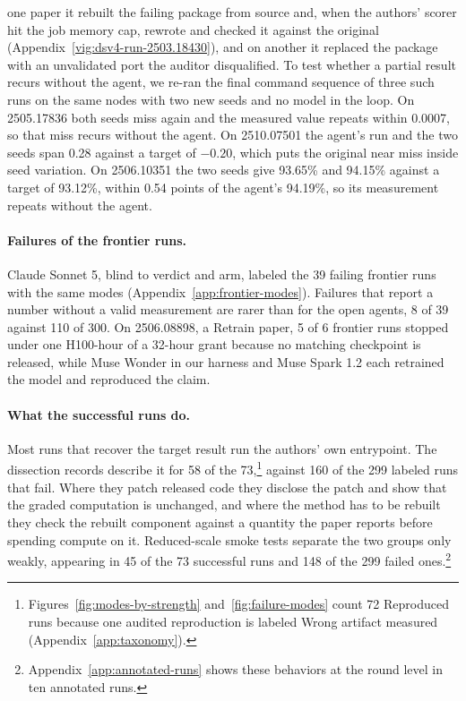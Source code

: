 \documentclass{article} %
\newcommand{\todo}[1]{#1}%
\begin{document}
one paper it rebuilt the failing package from source and, when the authors' scorer hit the job memory cap, rewrote and checked it against the original (Appendix~\ref{vig:dsv4-run-2503.18430}), and on another
it replaced the package with an unvalidated port the auditor disqualified.
To test whether a partial result recurs without the agent, we
re-ran the final command sequence of three such runs on the same nodes with
two new seeds and no model in the loop. On 2505.17836 both seeds miss again
and the measured value repeats within 0.0007, so that miss recurs without the
agent. On 2510.07501 the agent's run and the two seeds span 0.28 against a target of
$-0.20$, which puts the original near miss inside seed variation.
On 2506.10351 the two seeds give 93.65\% and 94.15\% against a target of 93.12\%, within 0.54 points of the agent's 94.19\%, so its measurement repeats without the agent.

\paragraph{Failures of the frontier runs.}
Claude Sonnet 5, blind to verdict and arm, labeled the \todo{39} failing frontier runs
with the same modes (Appendix~\ref{app:frontier-modes}). Failures that report a
number without a valid measurement are rarer than for the open agents,
\todo{8 of 39} against 110 of 300. On 2506.08898, a Retrain paper,
\todo{5 of 6} frontier runs stopped under one H100-hour of a 32-hour grant
because no matching checkpoint is released, while \todo{Muse Wonder in our
harness} and Muse Spark 1.2 each retrained the model and reproduced the claim.

\paragraph{What the successful runs do.}
Most runs that recover the target result run the authors' own entrypoint. The
dissection records describe it for 58 of the 73,\footnote{Figures~\ref{fig:modes-by-strength} and~\ref{fig:failure-modes} count 72 Reproduced runs because one audited reproduction is labeled Wrong artifact measured (Appendix~\ref{app:taxonomy}).} against 160 of the 299 labeled runs
that fail. Where they patch released code they disclose the patch and show
that the graded computation is unchanged, and where the method has to be
rebuilt they check the rebuilt component against a quantity the paper reports
before spending compute on it. Reduced-scale smoke tests separate the two
groups only weakly, appearing in 45 of the 73 successful runs
and 148 of the 299 failed ones.\footnote{Appendix~\ref{app:annotated-runs} shows
these behaviors at the round level in ten annotated runs.}
\end{document}
